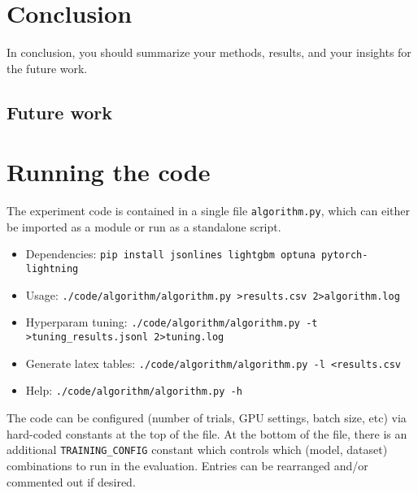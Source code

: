 \documentclass{article} %
\begin{document}
\section{Conclusion}
In conclusion, you should summarize your methods, results, and your insights for the future work.

\subsection{Future work}


\printbibliography\appendix

\section{Running the code}
The experiment code is contained in a single file \texttt{algorithm.py}, which can either be imported as a module or run as a standalone script.

\begin{itemize}
\item Dependencies: \texttt{pip install jsonlines lightgbm optuna pytorch-lightning}
\item Usage: \texttt{./code/algorithm/algorithm.py >results.csv 2>algorithm.log}
\item Hyperparam tuning: \texttt{./code/algorithm/algorithm.py -t >tuning\_results.jsonl 2>tuning.log}
\item Generate latex tables: \texttt{./code/algorithm/algorithm.py -l <results.csv}
\item Help: \texttt{./code/algorithm/algorithm.py -h}
\end{itemize}

The code can be configured (number of trials, GPU settings, batch size, etc) via hard-coded constants at the top of the file. At the bottom of the file, there is an additional \texttt{TRAINING\_CONFIG} constant which controls which (model, dataset) combinations to run in the evaluation. Entries can be rearranged and/or commented out if desired.
\end{document}
